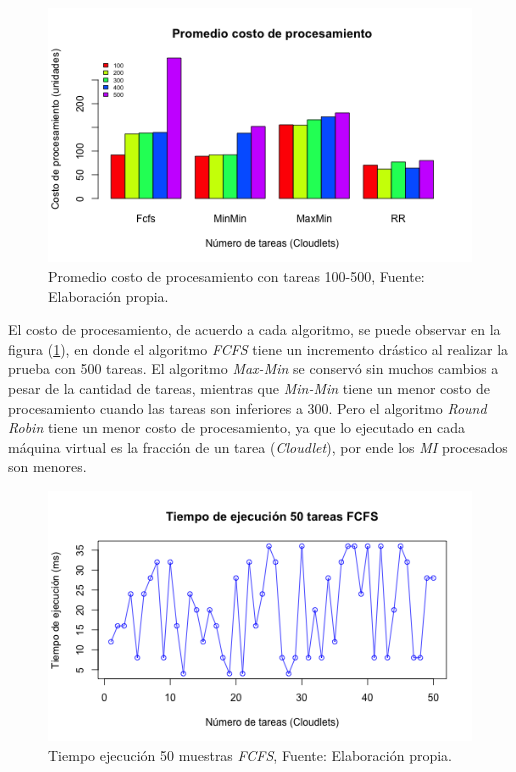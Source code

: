 \label{etiqueta}
\newpage

\renewcommand\thefigure{\arabic{figure}}
\begin{figure}[h!] 
	\centering
	\includegraphics[scale=0.6]{media/costoproce}
	\caption{Promedio costo de procesamiento con tareas 100-500, Fuente: Elaboraci\'on propia.}
	\label{fig:costo}
\end{figure}


El costo de procesamiento, de acuerdo a cada algoritmo, se puede observar en la figura (\ref{fig:costo}), en donde el algoritmo \textit{FCFS} tiene un incremento dr\'astico al realizar la prueba con 500 tareas. El algoritmo \textit{Max-Min} se conserv\'o sin muchos cambios a pesar de la cantidad de tareas, mientras que \textit{Min-Min} tiene un menor costo de procesamiento cuando las tareas son inferiores a 300. Pero el algoritmo \textit{Round Robin} tiene un menor costo de procesamiento, ya que lo ejecutado en cada máquina virtual es la fracción de un tarea (\textit{Cloudlet}), por ende los \textit{MI} procesados son menores.
\label{etiqueta2}
\newpage

\renewcommand\thefigure{\arabic{figure}}
\begin{figure}[h!] 
	\centering
	\includegraphics[scale=0.6]{media/fcfs}
	\caption{Tiempo ejecuci\'on 50 muestras \textit{FCFS}, Fuente: Elaboraci\'on propia.}
	\label{fig:ejecucion}
\end{figure}



